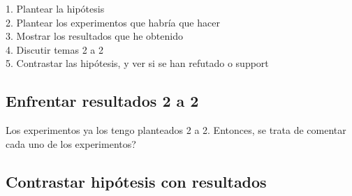 1. Plantear la hipótesis \\
2. Plantear los experimentos que habría que hacer \\
3. Mostrar los resultados que he obtenido \\
4. Discutir temas 2 a 2 \\
5. Contrastar las hipótesis, y ver si se han refutado o support \\





\subsection{Enfrentar resultados 2 a 2}
  \begin{note}
    Los experimentos ya los tengo planteados 2 a 2. Entonces, se trata de
    comentar cada uno de los experimentos?
  \end{note}

\subsection{Contrastar hipótesis con resultados}
